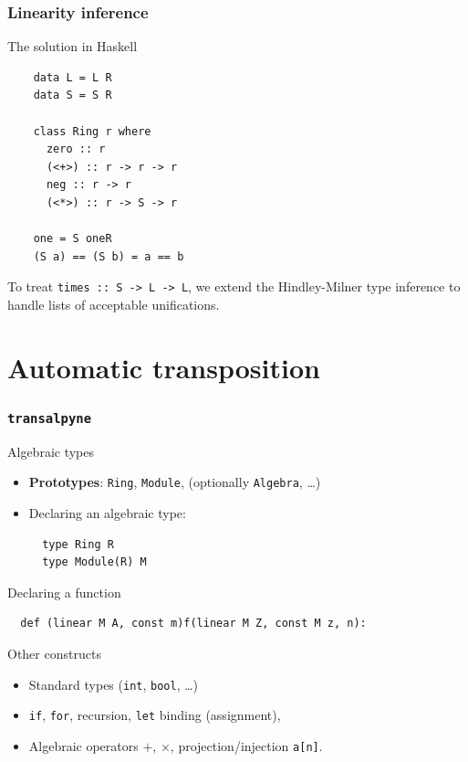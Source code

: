 \documentclass[10pt]{beamer}
\newcommand{\tALpy}{\texttt{transalpyne}}
\begin{document}
\begin{frame}[fragile]
  \frametitle{Linearity inference}
  
  \begin{center}
    The solution in Haskell
  \end{center}

  \begin{lstlisting}
    data L = L R
    data S = S R
    
    class Ring r where
      zero :: r
      (<+>) :: r -> r -> r
      neg :: r -> r
      (<*>) :: r -> S -> r

    one = S oneR
    (S a) == (S b) = a == b
  \end{lstlisting}

  \begin{center}
    To treat \alert{\lstinline{times :: S -> L -> L}}, we extend the
    Hindley-Milner type inference to handle lists of acceptable
    unifications.
  \end{center}
\end{frame}


\section{Automatic transposition}

\lstset{language=python}

\begin{frame}[fragile]
  \frametitle{\tALpy{}}

  \begin{block}{Algebraic types}
    \begin{itemize}
    \item \textbf{Prototypes}: {\tt Ring}, {\tt Module}, (optionally
      {\tt Algebra}, \dots)
    \item Declaring an algebraic type:
\begin{lstlisting}
  type Ring R
  type Module(R) M
\end{lstlisting}
    \end{itemize}
  \end{block}

  \begin{block}{Declaring a function}
\begin{lstlisting}
  def (linear M A, const m)f(linear M Z, const M z, n):
\end{lstlisting}
  \end{block}

  \begin{block}{Other constructs}
    \begin{itemize}
    \item Standard types ({\tt int}, {\tt bool}, \ldots)
    \item {\tt if}, {\tt for}, recursion, {\tt let} binding (assignment),
    \item Algebraic operators $+$, $\times$, projection/injection
      \verb|a[n]|.
    \end{itemize}
  \end{block}
\end{frame}
\end{document}
